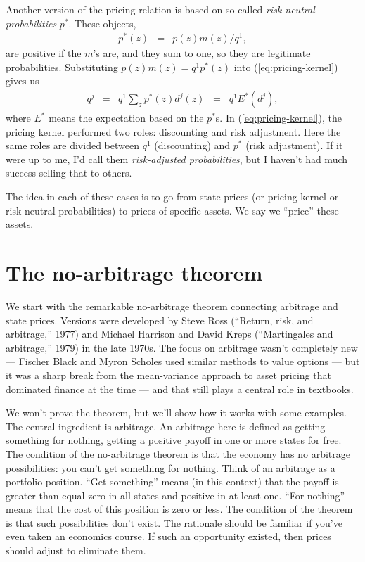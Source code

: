 \documentclass[11pt]{article}
\begin{document}
Another version of the pricing relation is based on so-called {\it risk-neutral probabilities\/} $p^*$.
These objects,
\begin{eqnarray*}
    p^*(z) &=& p(z) m(z) /q^1 ,
\end{eqnarray*}
are positive if the $m$'s are, and they sum to one,
so they are legitimate probabilities.
Substituting $ p(z) m(z) = q^1 p^*(z) $ into (\ref{eq:pricing-kernel}) gives us
\begin{eqnarray}
    q^j   &=& q^1 \sum_z p^*(z) d^j(z)  \;\;=\;\; q^1 E^* (d^j) ,
    \label{eq:risk-neutral-probs}
\end{eqnarray}
where $E^*$ means the expectation based on the $p^*$s.
In (\ref{eq:pricing-kernel}), the pricing kernel performed two roles:
discounting and risk adjustment.
Here the same roles are divided between $q^1$ (discounting)
and $p^*$ (risk adjustment).
If it were up to me, I'd call them {\it risk-adjusted probabilities\/},
but I haven't had much success selling that to others.


The idea in each of these cases is to go from
state prices (or pricing kernel or risk-neutral probabilities)
to prices of specific assets.
We say we ``price'' these assets.


\section{The no-arbitrage theorem}

We start with the remarkable no-arbitrage theorem
connecting arbitrage and state prices.
Versions were developed by
Steve Ross (``Return, risk, and arbitrage,'' 1977)
and Michael Harrison and David Kreps (``Martingales and arbitrage,'' 1979)
in the late 1970s.
The focus on arbitrage wasn't completely new ---
Fischer Black and Myron Scholes used similar methods to value options ---
but it was a sharp break from the mean-variance approach to asset pricing
that dominated finance at the time ---
and that still plays a central role in textbooks.

We won't prove the theorem, but we'll show how it works with some examples.
The central ingredient is arbitrage.
An arbitrage here is defined as getting something for nothing,
getting a positive payoff in one or more states for free.
The condition of the no-arbitrage theorem is that the economy has no
arbitrage possibilities:  you can't get something for nothing.
Think of an arbitrage as a portfolio position.
``Get something'' means (in this context) that the payoff is greater than
equal zero in all states and positive in at least one.
``For nothing'' means that the cost of this position is zero or less.
The condition of the theorem is that such possibilities don't exist.
The rationale should be familiar if you've even taken an economics course.
If such an opportunity existed, then prices should adjust to eliminate them.
\end{document}
